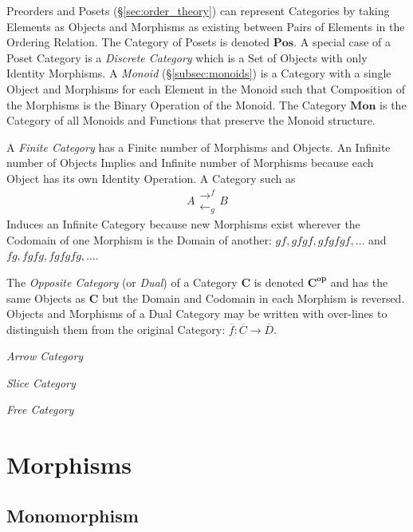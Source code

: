 \documentclass{article}
\begin{document}
Preorders and Posets (\S\ref{sec:order_theory}) can
represent Categories by taking Elements as Objects and Morphisms as
existing between Pairs of Elements in the Ordering Relation. The
Category of Posets is denoted $\mathbf{Pos}$. A special case of a
Poset Category is a \emph{Discrete Category} which is a Set of Objects
with only Identity Morphisms. A \emph{Monoid} (\S\ref{subsec:monoids})
is a Category with a single Object and Morphisms for each Element in
the Monoid such that Composition of the Morphisms is the Binary
Operation of the Monoid. The Category $\mathbf{Mon}$ is the Category
of all Monoids and Functions that preserve the Monoid structure.

A \emph{Finite Category} has a Finite number of Morphisms and
Objects. An Infinite number of Objects Implies and Infinite number of
Morphisms because each Object has its own Identity Operation. A
Category such as
\[
    A
    \begin{matrix}
    \rightarrow^f\\
    \leftarrow_g
    \end{matrix}
    B
\]
Induces an Infinite Category because new Morphisms exist wherever the
Codomain of one Morphism is the Domain of another: $gf, gfgf, gfgfgf,
\ldots$ and $fg, fgfg, fgfgfg, \ldots$.

The \emph{Opposite Category} (or \emph{Dual}) of a Category
$\mathbf{C}$ is denoted $\mathbf{C^{op}}$ and has the same Objects as
$\mathbf{C}$ but the Domain and Codomain in each Morphism is
reversed. Objects and Morphisms of a Dual Category may be written with
over-lines to distinguish them from the original Category:
$\overline{f}: \overline{C} \rightarrow \overline{D}$.

\emph{Arrow Category}

\emph{Slice Category}

\emph{Free Category}

\section{Morphisms}\label{sec:category_morphisms}

\subsection{Monomorphism}
\end{document}
